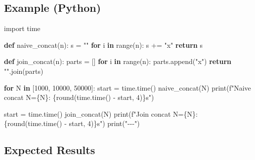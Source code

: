 \documentclass[
  letterpaper,
  DIV=11,
  numbers=noendperiod]{scrreprt}
\newenvironment{Shaded}{\begin{snugshade}}{\end{snugshade}}
\newcommand{\BuiltInTok}[1]{\textcolor[rgb]{0.00,0.23,0.31}{#1}}
\newcommand{\ControlFlowTok}[1]{\textcolor[rgb]{0.00,0.23,0.31}{\textbf{#1}}}
\newcommand{\DecValTok}[1]{\textcolor[rgb]{0.68,0.00,0.00}{#1}}
\newcommand{\ImportTok}[1]{\textcolor[rgb]{0.00,0.46,0.62}{#1}}
\newcommand{\KeywordTok}[1]{\textcolor[rgb]{0.00,0.23,0.31}{\textbf{#1}}}
\newcommand{\NormalTok}[1]{\textcolor[rgb]{0.00,0.23,0.31}{#1}}
\newcommand{\OperatorTok}[1]{\textcolor[rgb]{0.37,0.37,0.37}{#1}}
\newcommand{\SpecialCharTok}[1]{\textcolor[rgb]{0.37,0.37,0.37}{#1}}
\newcommand{\SpecialStringTok}[1]{\textcolor[rgb]{0.13,0.47,0.30}{#1}}
\newcommand{\StringTok}[1]{\textcolor[rgb]{0.13,0.47,0.30}{#1}}
\begin{document}
\subsection{Example (Python)}\label{example-python-2}

\begin{Shaded}
\begin{Highlighting}[]
\ImportTok{import}\NormalTok{ time}

\KeywordTok{def}\NormalTok{ naive\_concat(n):}
\NormalTok{    s }\OperatorTok{=} \StringTok{""}
    \ControlFlowTok{for}\NormalTok{ i }\KeywordTok{in} \BuiltInTok{range}\NormalTok{(n):}
\NormalTok{        s }\OperatorTok{+=} \StringTok{"x"}
    \ControlFlowTok{return}\NormalTok{ s}

\KeywordTok{def}\NormalTok{ join\_concat(n):}
\NormalTok{    parts }\OperatorTok{=}\NormalTok{ []}
    \ControlFlowTok{for}\NormalTok{ i }\KeywordTok{in} \BuiltInTok{range}\NormalTok{(n):}
\NormalTok{        parts.append(}\StringTok{"x"}\NormalTok{)}
    \ControlFlowTok{return} \StringTok{""}\NormalTok{.join(parts)}

\ControlFlowTok{for}\NormalTok{ N }\KeywordTok{in}\NormalTok{ [}\DecValTok{1000}\NormalTok{, }\DecValTok{10000}\NormalTok{, }\DecValTok{50000}\NormalTok{]:}
\NormalTok{    start }\OperatorTok{=}\NormalTok{ time.time()}
\NormalTok{    naive\_concat(N)}
    \BuiltInTok{print}\NormalTok{(}\SpecialStringTok{f"Naive concat N=}\SpecialCharTok{\{}\NormalTok{N}\SpecialCharTok{\}}\SpecialStringTok{: }\SpecialCharTok{\{}\BuiltInTok{round}\NormalTok{(time.time() }\OperatorTok{{-}}\NormalTok{ start, }\DecValTok{4}\NormalTok{)}\SpecialCharTok{\}}\SpecialStringTok{s"}\NormalTok{)}

\NormalTok{    start }\OperatorTok{=}\NormalTok{ time.time()}
\NormalTok{    join\_concat(N)}
    \BuiltInTok{print}\NormalTok{(}\SpecialStringTok{f"Join concat N=}\SpecialCharTok{\{}\NormalTok{N}\SpecialCharTok{\}}\SpecialStringTok{: }\SpecialCharTok{\{}\BuiltInTok{round}\NormalTok{(time.time() }\OperatorTok{{-}}\NormalTok{ start, }\DecValTok{4}\NormalTok{)}\SpecialCharTok{\}}\SpecialStringTok{s"}\NormalTok{)}
    \BuiltInTok{print}\NormalTok{(}\StringTok{"{-}{-}{-}"}\NormalTok{)}
\end{Highlighting}
\end{Shaded}

\subsection{Expected Results}\label{expected-results-3}
\end{document}
